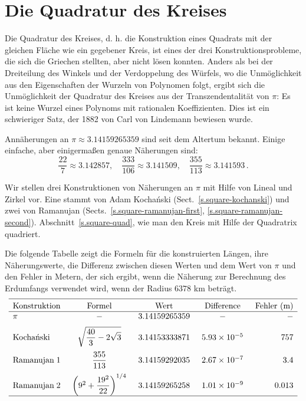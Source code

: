 
\chapter{Die Quadratur des Kreises}\label{c.square}


Die Quadratur des Kreises, d. h. die Konstruktion eines Quadrats mit der gleichen Fläche wie ein gegebener Kreis, ist eines der drei Konstruktionsprobleme, die sich die Griechen stellten, aber nicht lösen konnten. Anders als bei der Dreiteilung des Winkels und der Verdoppelung des Würfels, wo die Unmöglichkeit aus den Eigenschaften der Wurzeln von Polynomen folgt, ergibt sich die Unmöglichkeit der Quadratur des Kreises aus der Transzendentalität von $\pi$: Es ist keine Wurzel eines Polynoms mit rationalen Koeffizienten. Dies ist ein schwieriger Satz, der 1882 von Carl von Lindemann bewiesen wurde.

Annäherungen an $\pi\approx 3.14159265359$ sind seit dem Altertum bekannt. Einige einfache, aber einigermaßen genaue Näherungen sind:
\[
\displaystyle\frac{22}{7}\approx 3.142857,\quad \displaystyle\frac{333}{106}\approx 3.141509,\quad \displaystyle\frac{355}{113}\approx 3.141593\,.
\]

Wir stellen drei Konstruktionen von Näherungen an $\pi$ mit Hilfe von Lineal und Zirkel vor. Eine stammt von Adam Kocha\'{n}ski (Sect.~\ref{s.square-kochanski}) und zwei von Ramanujan (Sects.~\ref{s.square-ramanujan-first}, \ref{s.square-ramanujan-second}). Abschnitt~\ref{s.square-quad}, wie man den Kreis mit Hilfe der Quadratrix quadriert.

Die folgende Tabelle zeigt die Formeln für die konstruierten Längen, ihre Näherungswerte, die Differenz zwischen diesen Werten und dem Wert von $\pi$ und den Fehler in Metern, der sich ergibt, wenn die Näherung zur Berechnung des Erdumfangs verwendet wird, wenn der Radius $6378$ km beträgt.
\[
\begin{array}{l@{\hspace{5mm}}c@{\hspace{5mm}}c@{\hspace{5mm}}c@{\hspace{5mm}}r}
\hline\noalign{\smallskip}
\textrm{Konstruktion} & \textrm{Formel} &\textrm{Wert} & \textrm{Difference} & \textrm{Fehler (m)}\\\hline
\pi & -& 3.14159265359 & - & -\\\noalign{\medskip}
\textrm{Kocha\'{n}ski} & \sqrt{\displaystyle\frac{40}{3}-2\sqrt{3}}&
  3.14153333871 & 5.93 \times 10^{-5} & 757\\\noalign{\medskip}
\textrm{Ramanujan}\; 1 & \displaystyle\frac{355}{113} &
  3.14159292035 &2.67  \times 10^{-7}&3.4\\\noalign{\medskip}
\textrm{Ramanujan}\; 2 &\left(9^2+\displaystyle\frac{19^2}{22}\right)^{1/4}&
  3.14159265258 & 1.01 \times 10^{-9}& 0.013\\
\hline\noalign{\smallskip}
\end{array}
\]

